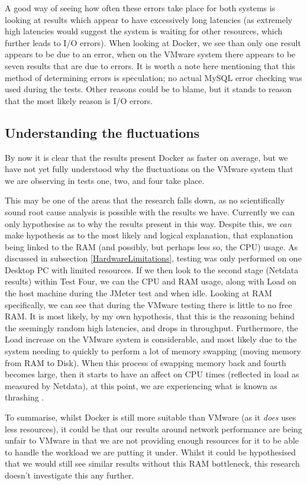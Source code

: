 A good way of seeing how often these errors take place for both systems is looking at results which appear to have excessively long latencies (as extremely high latencies would suggest the system is waiting for other resources, which further leads to I/O errors). When looking at Docker, we see than only one result appears to be due to an error, when on the VMware system there appears to be seven results that are due to errors. It is worth a note here mentioning that this method of determining errors is speculation; no actual MySQL error checking was used during the tests. Other reasons could be to blame, but it stands to reason that the most likely reason is I/O errors.

\subsection{Understanding the fluctuations}
By now it is clear that the results present Docker as faster on average, but we have not yet fully understood why the fluctuations on the VMware system that we are observing in tests one, two, and four take place.

This may be one of the areas that the research falls down, as no scientifically sound root cause analysis is possible with the results we have. Currently we can only hypothesise as to why the results present in this way. Despite this, we \emph{can} make hypothesis as to the most likely and logical explanation, that explanation being linked to the RAM (and possibly, but perhaps less so, the CPU) usage. As discussed in subsection \ref{HardwareLimitations}, testing was only performed on one Desktop PC with limited resources. If we then look to the second stage (Netdata results) within Test Four, we can the CPU and RAM usage, along with Load on the host machine during the JMeter test and when idle. Looking at RAM specifically, we can see that during the VMware testing there is little to no free RAM. It is most likely, by my own hypothesis, that this is the reasoning behind the seemingly random high latencies, and drops in throughput. Furthermore, the Load increase on the VMware system is considerable, and most likely due to the system needing to quickly to perform a lot of memory swapping (moving memory from RAM to Disk). When this process of swapping memory back and fourth becomes large, then it starts to have an affect on CPU times (reflected in load as measured by Netdata), at this point, we are experiencing what is known as thrashing \citep{thrashing}.

To summarise, whilst Docker is still more suitable than VMware (as it \emph{does} uses less resources), it could be that our results around network performance are being unfair to VMware in that we are not providing enough resources for it to be able to handle the workload we are putting it under. Whilst it could be hypothesised that we would still see similar results without this RAM bottleneck, this research doesn't investigate this any further.

